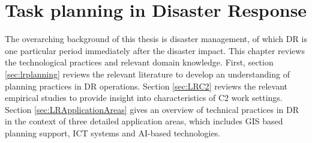 \chapter{Task planning in Disaster Response}\label{ch:literatures}
The overarching background of this thesis is disaster management, of which \acf{DR} is one particular period immediately after the disaster impact. This chapter reviews the technological practices and relevant domain knowledge. First, section \ref{sec:lrplanning} reviews the relevant literature to develop an understanding of planning practices in \ac{DR} operations. Section \ref{sec:LRC2} reviews the relevant empirical studies to provide insight into characteristics of \ac{C2} work settings. Section \ref{sec:LRApplicationAreas} gives an overview of technical practices in \ac{DR} in the context of three detailed application areas, which includes \acf{GIS} based planning support, \acf{ICT} systems and \ac{AI}-based technologies. \\



